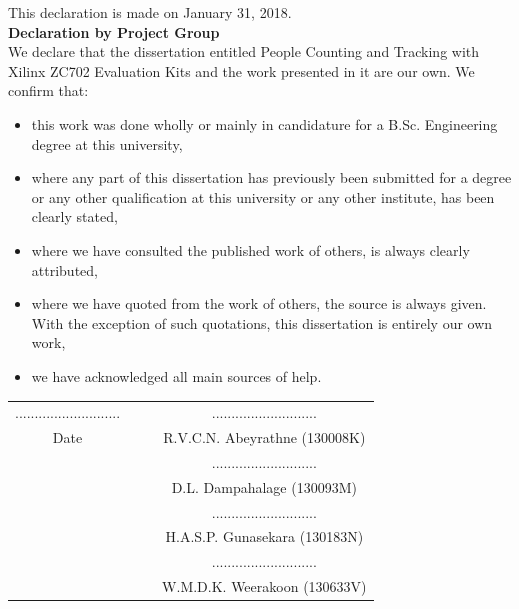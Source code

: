 \documentclass[12pt,a4paper]{report}
\begin{document}
\newpage
{}
\begin{center}
\fontsize{18pt}{12}
\end{center}
\fontsize{12pt}{12}\selectfont
This declaration is made on January 31, 2018.\\[1cm]
\textbf{Declaration by Project Group}\\
We declare that the dissertation entitled People Counting and Tracking with Xilinx ZC702 Evaluation Kits and the work presented in it are our own. We confirm that:
\begin{itemize}
\item this work was done wholly or mainly in candidature for a B.Sc. Engineering degree at this university,
\item where any part of this dissertation has previously been submitted for a degree or any other qualification at this university or any other institute, has been clearly stated,
\item where we have consulted the published work of others, is always clearly attributed,
\item where we have quoted from the work of others, the source is always given. With the exception of such quotations, this dissertation is entirely our own work,
\item we have acknowledged all main sources of help.
\end{itemize}
\vspace{1cm}
\begin{table}[h]
\begin{tabular}{cccc}
........................... &&& \hspace{5cm}...........................  \\
Date                        &&& \hspace{5cm}R.V.C.N. Abeyrathne (130008K) \\[1cm]
                            &&& \hspace{5cm}...........................  \\
                            &&& \hspace{5cm}D.L. Dampahalage (130093M)    \\[1cm]
                            &&& \hspace{5cm}...........................  \\
                            &&& \hspace{5cm}H.A.S.P. Gunasekara (130183N) \\[1cm]
                            &&& \hspace{5cm}...........................  \\
                            &&& \hspace{5cm}W.M.D.K. Weerakoon (130633V) 
\end{tabular}
\end{table}
\end{document}
